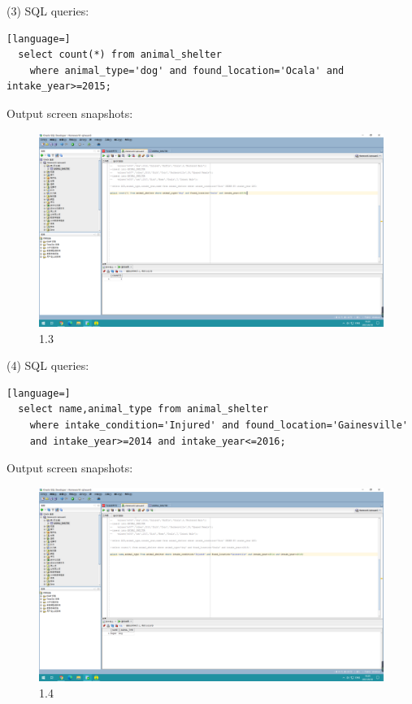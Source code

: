 \documentclass[]{article}
\begin{document}
(3) SQL queries:
	\begin{lstlisting}[language=] 
  select count(*) from animal_shelter 
    where animal_type='dog' and found_location='Ocala' and intake_year>=2015;
	\end{lstlisting} 
	Output screen snapshots:
	\begin{figure}[H]
		\centering
		\includegraphics[width=0.90\linewidth]{./document-H1/exercise1/1.3}
		\caption{1.3}
		\label{1.3}
	\end{figure}

(4) SQL queries:
	\begin{lstlisting}[language=] 
  select name,animal_type from animal_shelter 
    where intake_condition='Injured' and found_location='Gainesville' 
    and intake_year>=2014 and intake_year<=2016;	
	\end{lstlisting} 
	Output screen snapshots:
	\begin{figure}[H]
		\centering
		\includegraphics[width=0.95\linewidth]{./document-H1/exercise1/1.4}
		\caption{1.4}
		\label{1.4}
	\end{figure}
\end{document}
